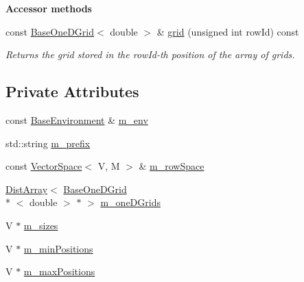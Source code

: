 \begin{Indent}{\bf Accessor methods}\par
\begin{DoxyCompactItemize}
\item 
const \hyperlink{class_q_u_e_s_o_1_1_base_one_d_grid}{Base\-One\-D\-Grid}$<$ double $>$ \& \hyperlink{class_q_u_e_s_o_1_1_array_of_one_d_grids_a1e09877a9c5e712a03812163f628685b}{grid} (unsigned int row\-Id) const 
\begin{DoxyCompactList}\small\item\em Returns the grid stored in the {\ttfamily row\-Id}-\/th position of the array of grids. \end{DoxyCompactList}\end{DoxyCompactItemize}
\end{Indent}
\subsection*{Private Attributes}
\begin{DoxyCompactItemize}
\item 
const \hyperlink{class_q_u_e_s_o_1_1_base_environment}{Base\-Environment} \& \hyperlink{class_q_u_e_s_o_1_1_array_of_one_d_grids_abe7ada351d4ab3d04987f52cfedb419c}{m\-\_\-env}
\item 
std\-::string \hyperlink{class_q_u_e_s_o_1_1_array_of_one_d_grids_ae9f51dffdcb939ac6b85d700a60fe167}{m\-\_\-prefix}
\item 
const \hyperlink{class_q_u_e_s_o_1_1_vector_space}{Vector\-Space}$<$ V, M $>$ \& \hyperlink{class_q_u_e_s_o_1_1_array_of_one_d_grids_af8f8d1a3e1d4f6213cf64698f95d34da}{m\-\_\-row\-Space}
\item 
\hyperlink{class_q_u_e_s_o_1_1_dist_array}{Dist\-Array}$<$ \hyperlink{class_q_u_e_s_o_1_1_base_one_d_grid}{Base\-One\-D\-Grid}\\*
$<$ double $>$ $\ast$ $>$ \hyperlink{class_q_u_e_s_o_1_1_array_of_one_d_grids_a0cdfeb23fce031448906cef8d15fd407}{m\-\_\-one\-D\-Grids}
\item 
V $\ast$ \hyperlink{class_q_u_e_s_o_1_1_array_of_one_d_grids_ae2164bf692a8fed51b630a114824ffa7}{m\-\_\-sizes}
\item 
V $\ast$ \hyperlink{class_q_u_e_s_o_1_1_array_of_one_d_grids_aaca722e41b97a006385c588ea888f7d9}{m\-\_\-min\-Positions}
\item 
V $\ast$ \hyperlink{class_q_u_e_s_o_1_1_array_of_one_d_grids_a8deeecb4b58f401acdc1fd101d6b5f42}{m\-\_\-max\-Positions}
\end{DoxyCompactItemize}
